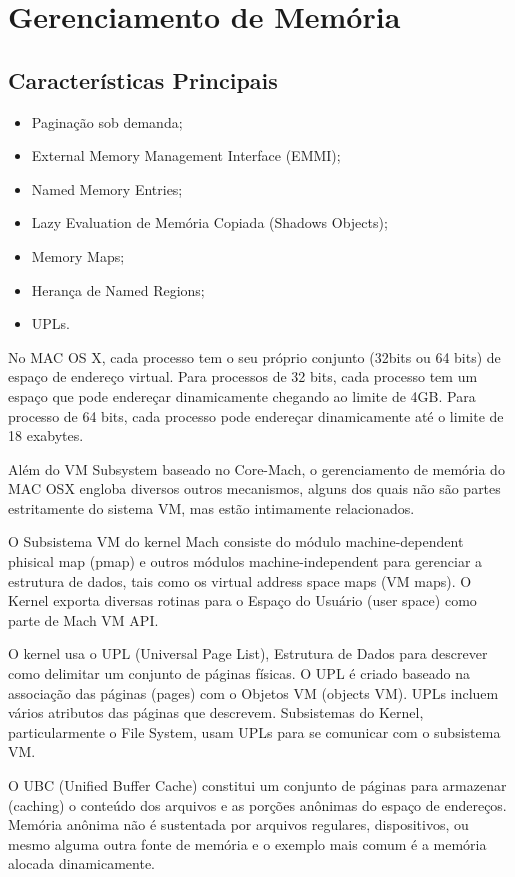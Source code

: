 \documentclass[12pt]{article}
\begin{document}
\section{Gerenciamento de Memória}
\subsection{Características Principais}
\begin{itemize}
    \item Paginação sob demanda;
    \item External Memory Management Interface (EMMI);
    \item Named Memory Entries;
    \item Lazy Evaluation de Memória Copiada (Shadows Objects);
    \item Memory Maps;
    \item Herança de Named Regions;
    \item UPLs.
\end{itemize}

No MAC OS X, cada processo tem o seu próprio conjunto (32bits ou 64 bits) de espaço de endereço virtual. Para processos de 32 bits, cada processo tem um espaço que pode endereçar dinamicamente chegando ao limite de 4GB. Para processo de 64 bits, cada processo pode endereçar dinamicamente até o limite de 18 exabytes.

Além do VM Subsystem baseado no Core-Mach, o gerenciamento de memória do MAC OSX engloba diversos outros mecanismos, alguns dos quais não são partes estritamente do sistema VM, mas estão intimamente relacionados.

O Subsistema VM do kernel Mach consiste do módulo machine-dependent phisical map (pmap) e outros módulos machine-independent para gerenciar a estrutura de dados, tais como os virtual address space maps (VM maps). O Kernel exporta diversas rotinas para o Espaço do Usuário (user space) como parte de Mach VM API.

O kernel usa o UPL (Universal Page List), Estrutura de Dados para descrever como delimitar um conjunto de páginas físicas. O UPL é criado baseado na associação das páginas (pages) com o Objetos VM (objects VM). UPLs incluem vários atributos das páginas que descrevem. Subsistemas do Kernel, particularmente o File System, usam UPLs para se comunicar com o subsistema VM.

O UBC (Unified Buffer Cache) constitui um conjunto de páginas para armazenar (caching) o conteúdo dos arquivos e as porções anônimas do espaço de endereços. Memória anônima não é sustentada por arquivos regulares, dispositivos, ou mesmo alguma outra fonte de memória e o exemplo mais comum é a memória alocada dinamicamente. 
\end{document}

